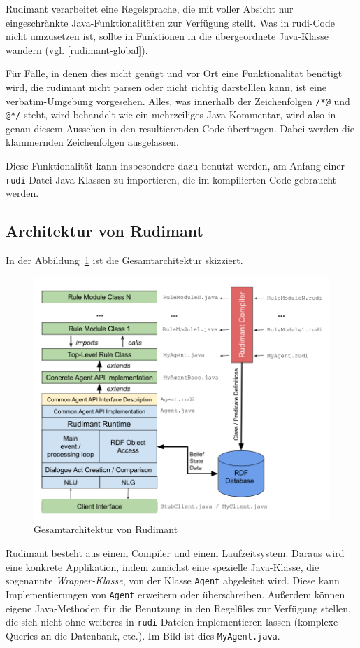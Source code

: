 Rudimant verarbeitet eine Regelsprache, die mit voller Absicht nur
eingeschränkte Java-Funktionalitäten zur Verfügung stellt. Was in rudi-Code
nicht umzusetzen ist, sollte in Funktionen in die übergeordnete Java-Klasse
wandern (vgl. \ref{rudimant-global}).

Für Fälle, in denen dies nicht genügt und vor Ort eine Funktionalität benötigt
wird, die rudimant nicht parsen oder nicht richtig darstelllen kann, ist eine
verbatim-Umgebung vorgesehen. Alles, was innerhalb der Zeichenfolgen \verb|/*@|
und \verb|@*/| steht, wird behandelt wie ein mehrzeiliges Java-Kommentar, wird
also in genau diesem Aussehen in den resultierenden Code übertragen. Dabei
werden die klammernden Zeichenfolgen ausgelassen.

Diese Funktionalität kann insbesondere dazu benutzt werden, am Anfang einer
\texttt{rudi} Datei Java-Klassen zu importieren, die im kompilierten Code
gebraucht werden.

\subsection{Architektur von Rudimant}

In der Abbildung~\ref{fig:architecture} ist die Gesamtarchitektur skizziert.

\begin{figure}[htbp]
  \centering
  \includegraphics[width=.8\textwidth]{RudimantStructure.png}
  \caption{Gesamtarchitektur von Rudimant}
  \label{fig:architecture}
\end{figure}

Rudimant besteht aus einem Compiler und einem Laufzeitsystem. Daraus wird eine
konkrete Applikation, indem zunächst eine spezielle Java-Klasse, die sogenannte
\emph{Wrapper-Klasse}, von der Klasse \texttt{Agent} abgeleitet wird. Diese
kann Implementierungen von \texttt{Agent} erweitern oder
überschreiben. Außerdem können eigene Java-Methoden für die Benutzung in den
Regelfiles zur Verfügung stellen, die sich nicht ohne weiteres in \texttt{rudi}
Dateien implementieren lassen (komplexe Queries an die Datenbank, etc.). Im
Bild ist dies \texttt{MyAgent.java}.

